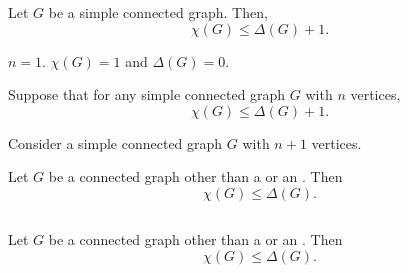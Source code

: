 \begin{frame}{}
  \begin{theorem}
    Let $G$ be a simple connected graph. Then,
    \[
      \chi(G) \le \Delta(G) + 1.
    \]
  \end{theorem}

  \pause
  \begin{center}

    \pause
    \vspace{0.20cm}
    \begin{description}
      \setlength{\itemsep}{5pt}
      \item[Basis Step:] $n = 1$. $\chi(G) = 1$ and $\Delta(G) = 0$.
      \item[Induction Hypothesis:] Suppose that for any simple connected graph $G$
        with $n$ vertices,
        \[
          \chi(G) \le \Delta(G) + 1.
        \]
      \item[Induction Step:] Consider a simple connected graph $G$ with $n+1$ vertices.
    \end{description}
  \end{center}
\end{frame}

\begin{frame}{}
  \begin{theorem}
    Let $G$ be a  connected graph other than a 
    or an . Then
    \[
      \chi(G) \le \Delta(G).
    \]
  \end{theorem}

  \begin{columns}
      \pause
      \pause
  \end{columns}
\end{frame}

\begin{frame}{}
  \begin{theorem}
    Let $G$ be a  connected graph other than a 
    or an . Then
    \[
      \chi(G) \le \Delta(G).
    \]
  \end{theorem}

  \pause
  \begin{center}
  \end{center}
\end{frame}
